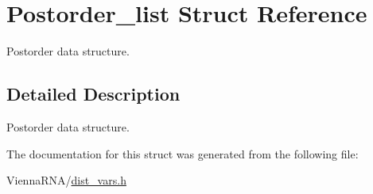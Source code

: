 \hypertarget{structPostorder__list}{}\section{Postorder\+\_\+list Struct Reference}
\label{structPostorder__list}


Postorder data structure.  




\subsection{Detailed Description}
Postorder data structure. 

The documentation for this struct was generated from the following file\+:\begin{DoxyCompactItemize}
\item 
Vienna\+R\+N\+A/\hyperlink{dist__vars_8h}{dist\+\_\+vars.\+h}\end{DoxyCompactItemize}
